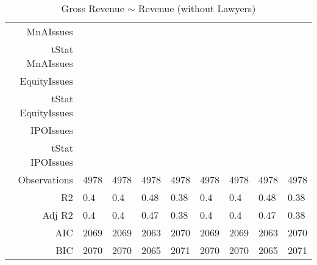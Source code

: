 \begin{table}[ht]
\begin{tabular}{rllllllll}
  MnAIssues &  &  &  &  &  &  &  &  \\ 
  tStat MnAIssues &  &  &  &  &  &  &  &  \\ 
  EquityIssues &  &  &  &  &  &  &  &  \\ 
  tStat EquityIssues &  &  &  &  &  &  &  &  \\ 
  IPOIssues &  &  &  &  &  &  &  &  \\ 
  tStat IPOIssues &  &  &  &  &  &  &  &  \\ 
  Observations & 4978 & 4978 & 4978 & 4978 & 4978 & 4978 & 4978 & 4978 \\ 
  R2 & 0.4 & 0.4 & 0.48 & 0.38 & 0.4 & 0.4 & 0.48 & 0.38 \\ 
  Adj R2 & 0.4 & 0.4 & 0.47 & 0.38 & 0.4 & 0.4 & 0.47 & 0.38 \\ 
  AIC & 2069 & 2069 & 2063 & 2070 & 2069 & 2069 & 2063 & 2070 \\ 
  BIC & 2070 & 2070 & 2065 & 2071 & 2070 & 2070 & 2065 & 2071 \\ 
   \hline
\end{tabular}
\caption{Gross Revenue $\sim$ Revenue (without Lawyers)} 
\end{table}
